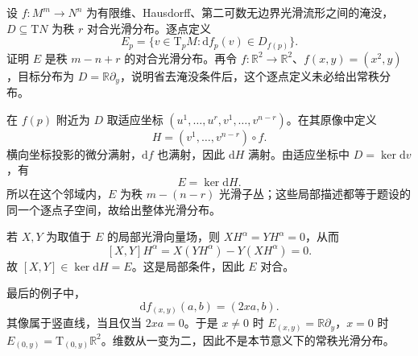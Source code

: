 \begin{exercise}\label{g1:ex:submersion-pullback-distribution}
	设 \(f:M^m\to N^n\) 为有限维、Hausdorff、第二可数无边界光滑流形之间的淹没，\(D\subseteq \mathrm{T}N\) 为秩 \(r\) 对合光滑分布。逐点定义
	\[
		E_p=\{v\in \mathrm{T}_pM:\mathrm{d}f_p(v)\in D_{f(p)}\}.
	\]
	证明 \(E\) 是秩 \(m-n+r\) 的对合光滑分布。再令 \(f:\mathbb R^2\to\mathbb R^2\)、\(f(x,y)=(x^2,y)\)，目标分布为 \(D=\mathbb R\partial_{y}\)，说明省去淹没条件后，这个逐点定义未必给出常秩分布。
\end{exercise}
\begin{solution}
	在 \(f(p)\) 附近为 \(D\) 取适应坐标 \((u^1,\ldots,u^r,v^1,\ldots,v^{n-r})\)。在其原像中定义
	\[
		H=(v^1,\ldots,v^{n-r})\circ f.
	\]
	横向坐标投影的微分满射，\(\mathrm{d}f\) 也满射，因此 \(\mathrm{d}H\) 满射。由适应坐标中 \(D=\ker\mathrm{d}v\)，有
	\[
		E=\ker\mathrm{d}H.
	\]
	所以在这个邻域内，\(E\) 为秩 \(m-(n-r)\) 光滑子丛；这些局部描述都等于题设的同一个逐点子空间，故给出整体光滑分布。

	若 \(X,Y\) 为取值于 \(E\) 的局部光滑向量场，则 \(XH^\alpha=YH^\alpha=0\)，从而
	\[
		[X,Y]H^\alpha=X(YH^\alpha)-Y(XH^\alpha)=0.
	\]
	故 \([X,Y]\in\ker\mathrm{d}H=E\)。这是局部条件，因此 \(E\) 对合。

	最后的例子中，
	\[
		\mathrm{d}f_{(x,y)}(a,b)=(2xa,b).
	\]
	其像属于竖直线，当且仅当 \(2xa=0\)。于是 \(x\ne0\) 时 \(E_{(x,y)}=\mathbb R\partial_y\)，\(x=0\) 时 \(E_{(0,y)}=\mathrm{T}_{(0,y)}\mathbb R^2\)。维数从一变为二，因此不是本节意义下的常秩光滑分布。
\end{solution}

